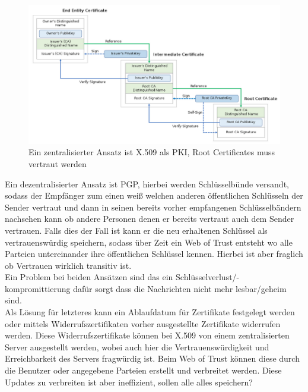 \documentclass[a4paper,12pt,leqno]{article}
\begin{document}
\begin{figure}
\label{pic:Chainoftrust}
\centering
\includegraphics[scale=0.5]{Grafiken/Chain-Of-Trust.png}
\caption{Ein zentralisierter Ansatz ist X.509 als PKI, Root Certificates muss vertraut werden}
\end{figure}

Ein dezentralisierter Ansatz ist PGP, hierbei werden Schlüsselbünde versandt, sodass der Empfänger zum einen weiß welchen anderen öffentlichen Schlüsseln der Sender vertraut und dann in seinen bereits vorher empfangenen Schlüsselbändern nachsehen kann ob andere Personen denen er bereits vertraut auch dem Sender vertrauen. Falls dies der Fall ist kann er die neu erhaltenen Schlüssel als vertrauenswürdig speichern, sodass über Zeit ein Web of Trust entsteht wo alle Parteien untereinander ihre öffentlichen Schlüssel kennen. Hierbei ist aber fraglich ob Vertrauen wirklich transitiv ist.\\

Ein Problem bei beiden Ansätzen sind das ein Schlüsselverlust/-kompromittierung dafür sorgt dass die Nachrichten nicht mehr lesbar/geheim sind.\\
Als Lösung für letzteres kann ein Ablaufdatum für Zertifikate festgelegt werden oder mittels Widerrufszertifikaten vorher ausgestellte Zertifikate widerrufen werden.
Diese Widerrufszertifikate können bei X.509 von einem zentralisierten Server ausgestellt werden, wobei auch hier die Vertrauenswürdigkeit und Erreichbarkeit des Servers fragwürdig ist.
Beim Web of Trust können diese durch die Benutzer oder angegebene Parteien erstellt und verbreitet werden. Diese Updates zu verbreiten ist aber ineffizient, sollen alle alles speichern?
\end{document}
